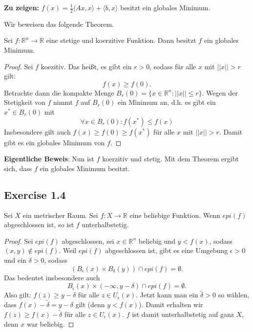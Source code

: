 \documentclass[a4paper, landscape,twocolumn,fontsize=9pt]{scrartcl}
\begin{document}
\textbf{Zu zeigen:} $f(x) = \frac{1}{2}\langle Ax,x \rangle + \langle b,x \rangle$ besitzt ein globales Minimum.

Wir beweisen das folgende Theorem.

\begin{theorem}{}{}
Sei $f: \mathbb R^n \to \mathbb R$ eine stetige und koerzitive Funktion. Dann besitzt $f$ ein globales Minimum.
\end{theorem}

\begin{proof}
Sei $f$ koezitiv. Das heißt, es gibt ein $r > 0$, sodass für alle $x$ mit $||x|| > r$ gilt:
\[
	f(x) \geq f(0).
\]
Betrachte dann die kompakte Menge $B_r(0) = \{ x \in \mathbb R^n : || x || \leq r \}$. Wegen der Stetigkeit von $f$ nimmt $f$ auf $B_r(0)$ ein Minimum an, d.h. es gibt ein $x^* \in B_r(0)$ mit
\[
	\forall x \in B_r(0): f(x^*) \leq f(x)
\]
Insbesondere gilt auch $f(x) \geq f(0) \geq f(x^*)$ für alle $x$ mit $||x|| > r$. Damit gibt es ein globales Minimum von $f$.
\end{proof}

\textbf{Eigentliche Beweis}: Nun ist $f$ koerzitiv und stetig. Mit dem Theorem ergibt sich, dass $f$ ein globales Minimum besitzt.

\subsection*{Exercise 1.4}
\begin{theorem}{}{}
Sei $X$ ein metrischer Raum. Sei $f: X \to \mathbb R$ eine beliebige Funktion. Wenn $epi(f)$ abgeschlossen ist, so ist $f$ unterhalbstetig.
\end{theorem}
\begin{proof}
Sei $epi(f)$ abgeschlossen, sei $x \in \mathbb R^n$ beliebig und $y < f(x)$, sodass $(x,y) \notin epi(f)$. Weil $epi(f)$ abgeschlossen ist, gibt es eine Umgebung $\epsilon > 0$ und ein $\delta > 0$, sodass 
\[
	(B_{\epsilon}(x) \times B_{\delta}(y)) \cap epi(f) = \emptyset.
\]
Das bedeutet insbesondere auch
\[
	B_{\epsilon}(x) \times (-\infty, y - \delta) \cap epi(f) = \emptyset.
\]
Also gilt: $f(z) \geq y - \delta$ für alle $z \in U_{\epsilon}(x)$. Jetzt kann man ein $\tilde \delta > 0$ so wählen, dass $f(x) - \tilde \delta = y - \delta$ gilt (denn $y < f(x)$). Damit erhalten wir $f(z) \geq f(x) - \tilde \delta$ für alle $z \in U_{\epsilon}(x)$. $f$ ist damit unterhalbstetig auf ganz $X$, denn $x$ war beliebig.
\end{proof}
\end{document}
